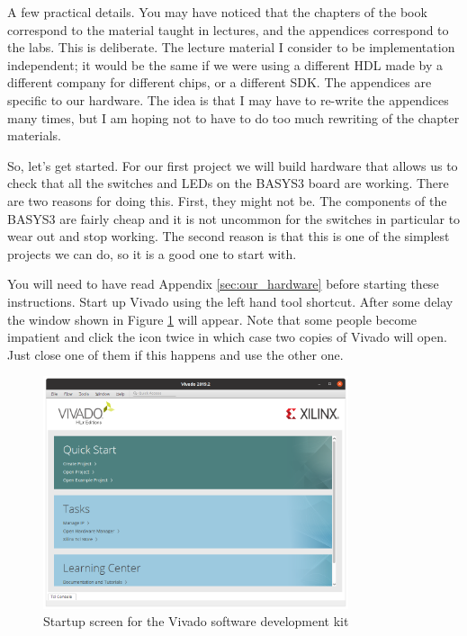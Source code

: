 \documentclass[../physical_computing.tex]{subfiles}
\begin{document}
A few practical details. You may have noticed that the chapters of the book correspond to the material taught in lectures, and the appendices correspond to the labs. This is deliberate. The lecture material I consider to be implementation independent; it would be the same if we were using a different HDL made by a different company for different chips, or a different SDK. The appendices are specific to our hardware. The idea is that I may have to re-write the appendices many times, but I am hoping not to have to do too much rewriting of the chapter materials.

So, let's get started. For our first project we will build hardware that allows us to check that all the switches and LEDs on the BASYS3 board are working. There are two reasons for doing this. First, they might not be. The components of the BASYS3 are fairly cheap and it is not uncommon for the switches in particular to wear out and stop working. The second reason is that this is one of the simplest projects we can do, so it is a good one to start with.

You will need to have read Appendix \ref{sec:our_hardware} before starting these instructions. Start up Vivado using the left hand tool shortcut. After some delay the window shown in Figure \ref{fig:vivado_startup} will appear. Note that some people become impatient and click the icon twice in which case two copies of Vivado will open. Just close one of them if this happens and use the other one.

\begin{figure}[htbp]
    \centering
    \includegraphics[width=0.8\textwidth]{figures/vivado_startup.png}
    \caption{Startup screen for the Vivado software development kit}
    \label{fig:vivado_startup}
\end{figure}
\end{document}
